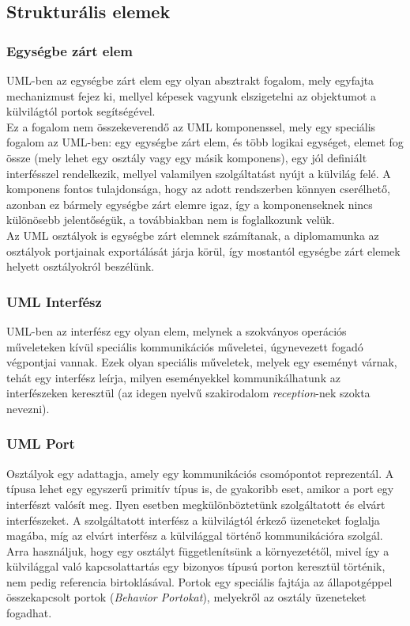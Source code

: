 \documentclass[a4paper,12pt]{report}
\begin{document}
\subsection{Strukturális elemek}
\subsubsection{Egységbe zárt elem} \label{class}
UML-ben az egységbe zárt elem egy olyan absztrakt fogalom, mely egyfajta mechanizmust fejez ki, mellyel képesek vagyunk elszigetelni az objektumot a külvilágtól portok segítségével.\\ Ez a fogalom nem összekeverendő az UML komponenssel, mely egy speciális fogalom az UML-ben: egy egységbe zárt elem, és több logikai egységet, elemet fog össze (mely lehet egy osztály vagy egy másik komponens), egy jól definiált interfésszel rendelkezik, mellyel valamilyen szolgáltatást nyújt a külvilág felé. A komponens fontos tulajdonsága, hogy az adott rendszerben könnyen cserélhető, azonban ez bármely egységbe zárt elemre igaz, így a komponenseknek nincs különösebb jelentőségük, a továbbiakban nem is foglalkozunk velük. \\
Az UML osztályok is egységbe zárt elemnek számítanak, a diplomamunka az osztályok portjainak exportálását járja körül, így mostantól egységbe zárt elemek helyett osztályokról beszélünk.
\subsubsection{UML Interfész}
UML-ben az interfész egy olyan elem, melynek a szokványos operációs műveleteken kívül speciális kommunikációs műveletei, úgynevezett fogadó végpontjai  vannak. Ezek olyan speciális műveletek, melyek egy eseményt várnak, tehát egy interfész leírja, milyen eseményekkel kommunikálhatunk az interfészeken keresztül (az idegen nyelvű szakirodalom \textit{reception}-nek szokta nevezni).
\subsubsection{UML Port}
Osztályok egy adattagja, amely egy kommunikációs csomópontot reprezentál. A típusa lehet egy egyszerű primitív típus is, de gyakoribb eset, amikor a port egy interfészt valósít meg. Ilyen esetben megkülönböztetünk szolgáltatott és elvárt interfészeket. A szolgáltatott interfész a külvilágtól érkező üzeneteket foglalja magába, míg az elvárt interfész a külvilággal történő kommunikációra szolgál. Arra használjuk, hogy egy osztályt függetlenítsünk a környezetétől, mivel így a külvilággal való kapcsolattartás egy bizonyos típusú porton keresztül történik, nem pedig referencia birtoklásával. Portok egy speciális fajtája az állapotgéppel összekapcsolt portok (\textit{Behavior Portokat}), melyekről az osztály üzeneteket fogadhat.
\end{document}
